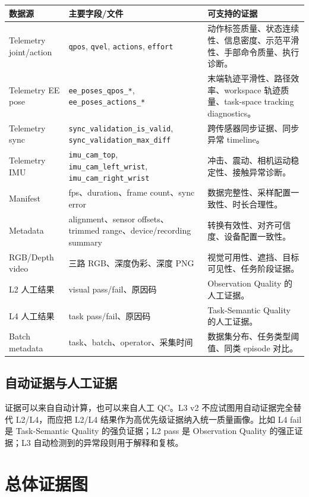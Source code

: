 \documentclass[UTF8,zihao=-4]{ctexart}
\newcommand{\Code}[1]{\texttt{#1}}
\begin{document}
\begin{longtable}{L{3.4cm} L{3.8cm} L{6.5cm}}
\toprule
数据源 & 主要字段/文件 & 可支持的证据 \\
\midrule
Telemetry joint/action & \Code{qpos}, \Code{qvel}, \Code{actions}, \Code{effort} & 动作标签质量、状态连续性、信息密度、示范平滑性、手部命令质量、执行诊断。 \\
Telemetry EE pose & \Code{ee\_poses\_qpos\_*}, \Code{ee\_poses\_actions\_*} & 末端轨迹平滑性、路径效率、workspace 轨迹质量、task-space tracking diagnostics。 \\
Telemetry sync & \Code{sync\_validation\_is\_valid}, \Code{sync\_validation\_max\_diff} & 跨传感器同步证据、同步异常 timeline。 \\
Telemetry IMU & \Code{imu\_cam\_top}, \Code{imu\_cam\_left\_wrist}, \Code{imu\_cam\_right\_wrist} & 冲击、震动、相机运动稳定性、接触异常诊断。 \\
Manifest & fps、duration、frame count、sync error & 数据完整性、采样配置一致性、时长合理性。 \\
Metadata & alignment、sensor offsets、trimmed range、device/recording summary & 转换有效性、对齐可信度、设备配置一致性。 \\
RGB/Depth video & 三路 RGB、深度伪彩、深度 PNG & 视觉可用性、遮挡、目标可见性、任务阶段证据。 \\
L2 人工结果 & visual pass/fail、原因码 & Observation Quality 的人工证据。 \\
L4 人工结果 & task pass/fail、原因码 & Task-Semantic Quality 的人工证据。 \\
Batch metadata & task、batch、operator、采集时间 & 数据集分布、任务类型阈值、同类 episode 对比。 \\
\bottomrule
\end{longtable}

\subsection{自动证据与人工证据}

证据可以来自自动计算，也可以来自人工 QC。L3 v2 不应试图用自动证据完全替代 L2/L4，而应把 L2/L4 结果作为高优先级证据纳入统一质量画像。比如 L4 fail 是 Task-Semantic Quality 的强负证据；L2 pass 是 Observation Quality 的强正证据；L3 自动检测到的异常段则用于解释和复核。

\section{总体证据图}
\end{document}
